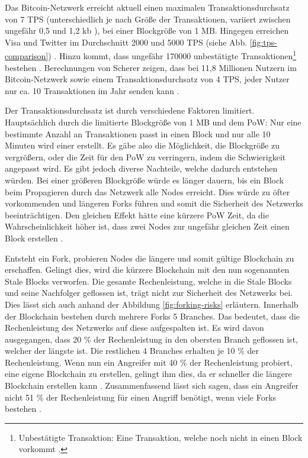 Das Bitcoin-Netzwerk erreicht aktuell einen maximalen Transaktionsdurchsatz von 7 \acs{TPS} (unterschiedlich je nach Größe der Transaktionen, variiert zwischen ungefähr 0,5 und 1,2 kb \cite{Bitcoin.comTeamBitcoinTransactionSize}), bei einer Blockgröße von 1 MB. Hingegen erreichen Visa und Twitter im Durchschnitt 2000 und 5000 \acs{TPS} (siehe Abb. \ref{fig:tps-comparison}) \cite[S.~28]{SwanBlockchainblueprintnew2015}. Hinzu kommt, dass ungefähr 170000 unbestätigte Transaktionen\footnote{Unbestätigte Transaktion: Eine Transaktion, welche noch nicht in einen Block vorkommt \cite[S.~13 ff.]{AntonopoulosMasteringbitcoin2015}.} bestehen \cite{BlockchainUnternehmenUnbestatigteTransaktionenBitcoin}. Berechnungen von Scherer zeigen, dass bei 11,8 Millionen Nutzern im Bitcoin-Netzwerk sowie einem Transaktionsdurchsatz von 4 \acs{TPS}, jeder Nutzer nur ca. 10 Transaktionen im Jahr senden kann \cite{SchererPerformanceScalabilityBlockchain2017}.

Der Transaktionsdurchsatz ist durch verschiedene Faktoren limitiert. Hauptsächlich durch die limitierte Blockgröße von 1 MB und dem \acs{PoW}: Nur eine bestimmte Anzahl an Transaktionen passt in einen Block und nur alle 10 Minuten wird einer erstellt. Es gäbe also die Möglichkeit, die Blockgröße zu vergrößern, oder die Zeit für den \acs{PoW} zu verringern, indem die Schwierigkeit angepasst wird. Es gibt jedoch diverse Nachteile, welche dadurch entstehen würden. Bei einer größeren Blockgröße würde es länger dauern, bis ein Block beim Propagieren durch das Netzwerk alle Nodes erreicht. Dies würde zu öfter vorkommenden und längeren Forks führen und somit die Sicherheit des Netzwerks beeinträchtigen. Den gleichen Effekt hätte eine kürzere \acs{PoW} Zeit, da die Wahrscheinlichkeit höher ist, dass zwei Nodes zur ungefähr gleichen Zeit einen Block erstellen \cite{SchererPerformanceScalabilityBlockchain2017}\cite{EthereumTeamEthereumWhitePaper2017}\cite{SompolinskyAcceleratingBitcoinTransaction2013}. 

Entsteht ein Fork, probieren Nodes die längere und somit gültige Blockchain zu erschaffen. Gelingt dies, wird die kürzere Blockchain mit den nun sogenannten Stale Blocks verworfen. Die gesamte Rechenleistung, welche in die Stale Blocks und seine Nachfolger geflossen ist, trägt nicht zur Sicherheit des Netzwerks bei. Dies lässt sich auch anhand der Abbildung \ref{fig:forking-risks} erläutern. Innerhalb der Blockchain bestehen durch mehrere Forks 5 Branches. Das bedeutet, dass die Rechenleistung des Netzwerks auf diese aufgespalten ist. Es wird davon ausgegangen, dass 20 \% der Rechenleistung in den obersten Branch geflossen ist, welcher der längste ist. Die restlichen 4 Branches erhalten je 10 \% der Rechenleistung. Wenn nun ein Angreifer mit 40 \% der Rechenleistung probiert, eine eigene Blockchain zu erstellen, gelingt ihm dies, da er schneller die längere Blockchain erstellen kann \cite{SompolinskyAcceleratingBitcoinTransaction2013}. Zusammenfassend lässt sich sagen, dass ein Angreifer nicht 51 \% der Rechenleistung für einen Angriff benötigt, wenn viele Forks bestehen \cite{Buterin12secondBlockTime2014}. 

